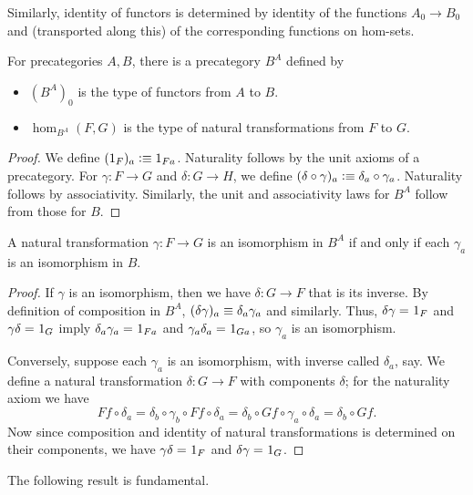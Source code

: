 Similarly, identity of functors is determined by identity of the functions $A_0\to B_0$ and (transported along this) of the corresponding functions on hom-sets.

\begin{defn}\label{ct:functor-precat}
  For precategories $A,B$, there is a precategory $B^A$ defined by
  \begin{itemize}
  \item $(B^A)_0$ is the type of functors from $A$ to $B$.
  \item $\hom_{B^A}(F,G)$ is the type of natural transformations from $F$ to $G$.
  \end{itemize}
\end{defn}
\begin{proof}
  We define $(1_F)_a\vcentcolon\equiv 1_{Fa}$.
  Naturality follows by the unit axioms of a precategory.
  For $\gamma:F\to G$ and $\delta:G\to H$, we define $(\delta\circ\gamma)_a\vcentcolon\equiv \delta_a\circ \gamma_a$.
  Naturality follows by associativity.
  Similarly, the unit and associativity laws for $B^A$ follow from those for $B$.
\end{proof}

\begin{lem}\label{ct:natiso}
  A natural transformation $\gamma:F\to G$ is an isomorphism in $B^A$ if and only if each $\gamma_a$ is an isomorphism in $B$.
\end{lem}
\begin{proof}
  If $\gamma$ is an isomorphism, then we have $\delta:G\to F$ that is its inverse.
  By definition of composition in $B^A$, $(\delta\gamma)_a\equiv \delta_a\gamma_a$ and similarly.
  Thus, $\delta\gamma =_{} 1_F$ and $\gamma\delta =_{} 1_G$ imply $\delta_a\gamma_a =_{} 1_{Fa}$ and $\gamma_a\delta_a =_{} 1_{Ga}$, so $\gamma_a$ is an isomorphism.

  Conversely, suppose each $\gamma_a$ is an isomorphism, with inverse called $\delta_a$, say.
We define a natural transformation $\delta:G\to F$ with components $\delta$; for the naturality axiom we have
  \[ Ff\circ \delta_a = \delta_b\circ \gamma_b\circ Ff \circ \delta_a = \delta_b\circ Gf\circ \gamma_a\circ \delta_a = \delta_b\circ Gf. \]
  Now since composition and identity of natural transformations is determined on their components, we have $\gamma\delta =_{} 1_F$ and $\delta\gamma =_{} 1_G$.
\end{proof}

The following result is fundamental.

